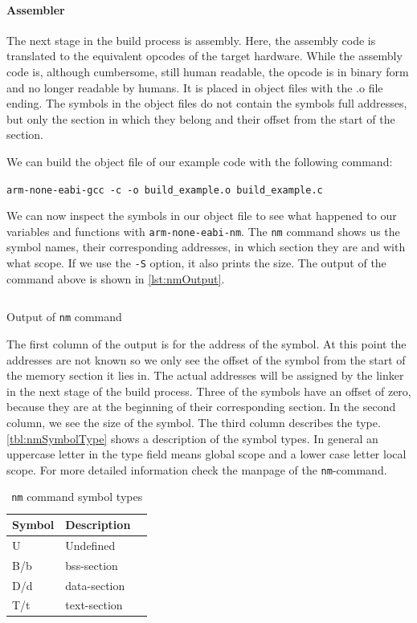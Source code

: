 \documentclass[a4paper,12pt]{article}
\newcommand{\inlinebash}[1]{\texttt{#1}}
\begin{document}
\paragraph{Assembler}\label{sec:assembler}
The next stage in the build process is assembly. Here, the assembly code is translated to the equivalent opcodes of the target hardware. While the assembly code is, although cumbersome, still human readable, the opcode is in binary form and no longer readable by humans. It is placed in object files with the .o file ending. The symbols in the object files do not contain the symbols full addresses, but only the section in which they belong and their offset from the start of the section.

We can build the object file of our example code with the following command:\newline

\inlinebash{arm-none-eabi-gcc -c -o build_example.o build_example.c}\newline

We can now inspect the symbols in our object file to see what happened to our variables and functions with \inlinebash{arm-none-eabi-nm}. The \inlinebash{nm} command shows us the symbol names, their corresponding addresses, in which section they are and with what scope. If we use the \inlinebash{-S} option, it also prints the size. The output of the command above is shown in \autoref{lst:nmOutput}.

\begin{listing}
  \inputminted{text}{code/build_example_nm.txt}
  \caption{Output of \inlinebash{nm} command}
  \label{lst:nmOutput}
\end{listing}

The first column of the output is for the address of the symbol. At this point the addresses are not known so we only see the offset of the symbol from the start of the memory section it lies in. The actual addresses will be assigned by the linker in the next stage of the build process. Three of the symbols have an offset of zero, because they are at the beginning of their corresponding section. In the second column, we see the size of the symbol. The third column describes the type. \autoref{tbl:nmSymbolType} shows a description of the symbol types. In general an uppercase letter in the type field means global scope and a lower case letter local scope. For more detailed information check the manpage of the \inlinebash{nm}-command.

\begin{table}[H]
\begin{tabular}{@{}llr@{}} \toprule
Symbol & Description \\ \midrule
U & Undefined \\
B/b & bss-section \\
D/d & data-section \\
T/t & text-section\\ \bottomrule
\end{tabular}
\centering
\caption{\inlinebash{nm} command symbol types}
\label{tbl:nmSymbolType}
\end{table}
\end{document}
